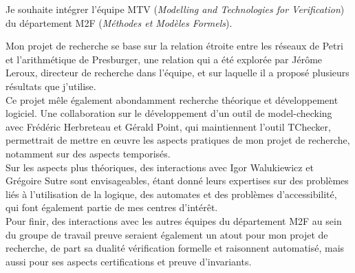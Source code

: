 Je souhaite intégrer l'équipe MTV (\emph{Modelling and Technologies for
Verification}) du département M2F (\emph{Méthodes et Modèles Formels}).

Mon projet de recherche se base sur la relation étroite entre les réseaux de
Petri et l'arithmétique de Presburger, une relation qui a été explorée par 
Jérôme Leroux, directeur de recherche dans l'équipe, et sur laquelle il a proposé
plusieurs résultats que j'utilise.\\

Ce projet mêle également abondamment recherche théorique et
développement logiciel. Une collaboration sur le développement d'un outil de
model-checking avec Frédéric Herbreteau et Gérald Point, qui maintiennent
l'outil TChecker, permettrait de mettre en œuvre les aspects pratiques de mon
projet de recherche, notamment sur des aspects temporisés.\\

Sur les aspects plus théoriques, des interactions avec Igor
Walukiewicz et Grégoire Sutre sont envisageables, étant donné leurs expertises
sur des problèmes liés à l'utilisation de la logique, des automates et des
problèmes d'accessibilité, qui font également partie de mes centres d'intérêt.\\

Pour finir, des interactions avec les autres équipes du département M2F au sein
du groupe de travail \og preuve \fg seraient également un atout pour mon projet
de recherche, de part sa dualité vérification formelle et raisonnent automatisé,
mais aussi pour ses aspects certifications et preuve d'invariants.

